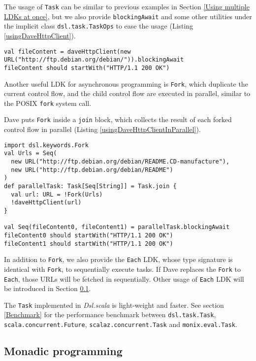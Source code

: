 The usage of \lstinline{Task} can be similar to previous examples in Section \ref{Using multiple LDKs at once}, but we also provide \lstinline{blockingAwait} and some other utilities under the implicit class \lstinline{dsl.task.TaskOps} to ease the usage (Listing \ref{usingDaveHttpClient}).

\begin{lstlisting}[caption={Using Dave's http client},label={usingDaveHttpClient}]
val fileContent = daveHttpClient(new URL("http://ftp.debian.org/debian/")).blockingAwait
fileContent should startWith("HTTP/1.1 200 OK")
\end{lstlisting}


Another useful LDK for asynchronous programming is \lstinline{Fork}, which duplicate the current control flow, and the child control flow are executed in parallel, similar to the POSIX \lstinline{fork} system call.

Dave puts \lstinline{Fork} inside a \lstinline{join} block, which collects the result of each forked control flow in parallel (Listing \ref{usingDaveHttpClientInParallel}).

\begin{lstlisting}[caption={Using Dave's http client in parallel},label={usingDaveHttpClientInParallel}]
import dsl.keywords.Fork
val Urls = Seq(
  new URL("http://ftp.debian.org/debian/README.CD-manufacture"),
  new URL("http://ftp.debian.org/debian/README")
)
def parallelTask: Task[Seq[String]] = Task.join {
  val url: URL = !Fork(Urls)
  !daveHttpClient(url)
}

val Seq(fileContent0, fileContent1) = parallelTask.blockingAwait
fileContent0 should startWith("HTTP/1.1 200 OK")
fileContent1 should startWith("HTTP/1.1 200 OK")
\end{lstlisting}

In addition to \lstinline{Fork}, we also provide the \lstinline{Each} LDK, whose type signature is identical with \lstinline{Fork}, to sequentially execute tasks. If Dave replaces the \lstinline{Fork} to \lstinline{Each}, those URLs will be fetched in sequentially. Other usage of \lstinline{Each} LDK will be introduced in Section \ref{Monadic programming}.

The \lstinline{Task} implemented in \textit{Dsl.scala} is light-weight and faster. See section \ref{Benchmark} for the performance benchmark between \lstinline{dsl.task.Task}, \lstinline{scala.concurrent.Future}, \lstinline{scalaz.concurrent.Task} and \lstinline{monix.eval.Task}.

\subsection{Monadic programming}\label{Monadic programming}

